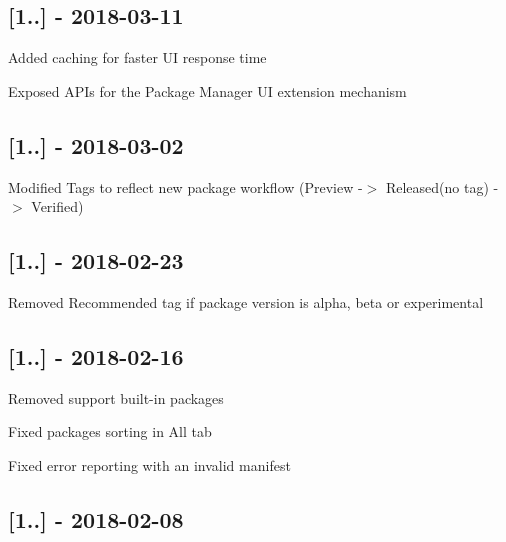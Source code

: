 \subsection*{\mbox{[}1..\mbox{]} -\/ 2018-\/03-\/11}


\begin{DoxyItemize}
\item Added caching for faster UI response time
\item Exposed A\+P\+Is for the Package Manager UI extension mechanism
\end{DoxyItemize}

\subsection*{\mbox{[}1..\mbox{]} -\/ 2018-\/03-\/02}


\begin{DoxyItemize}
\item Modified Tags to reflect new package workflow (Preview -\/$>$ Released(no tag) -\/$>$ Verified)
\end{DoxyItemize}

\subsection*{\mbox{[}1..\mbox{]} -\/ 2018-\/02-\/23}


\begin{DoxyItemize}
\item Removed Recommended tag if package version is alpha, beta or experimental
\end{DoxyItemize}

\subsection*{\mbox{[}1..\mbox{]} -\/ 2018-\/02-\/16}


\begin{DoxyItemize}
\item Removed support built-\/in packages
\item Fixed packages sorting in All tab
\item Fixed error reporting with an invalid manifest
\end{DoxyItemize}

\subsection*{\mbox{[}1..\mbox{]} -\/ 2018-\/02-\/08}



